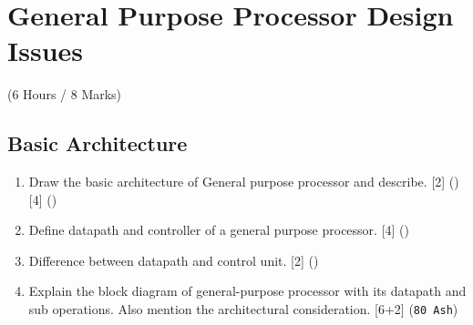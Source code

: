 \documentclass[12pt]{article}
\begin{document}
\pagebreak

\section{General Purpose Processor Design Issues}
  \begin{center}(6 Hours / 8 Marks)\end{center}
  
  \subsection{Basic Architecture}
    \begin{enumerate}[topsep=0pt]
      \item Draw the basic architecture of General purpose processor and describe. \hfill [2] () [4] ()
      
      \item Define datapath and controller of a general purpose processor. \hfill [4] () 
      
      \item Difference between datapath and control unit. \hfill [2] () 

      \item Explain the block diagram of general-purpose processor with its datapath and sub operations. Also mention the architectural consideration. \hfill [6+2] (\texttt{80 Ash})
    \end{enumerate}
\end{document}
